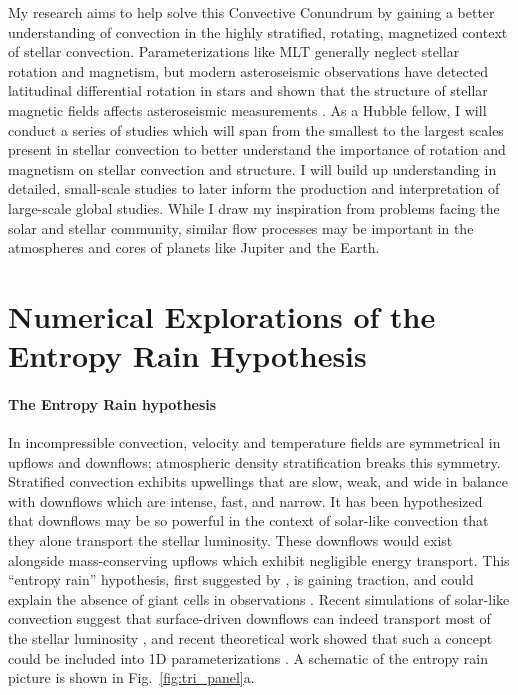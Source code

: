 \documentclass[preprint, hmargin=1in, vmargin=1in]{aastex62}
\begin{document}
My research aims to  help solve this Convective Conundrum by gaining a better understanding of convection in the highly stratified, rotating, magnetized context of stellar convection.
Parameterizations like MLT generally neglect stellar rotation and magnetism, but modern asteroseismic observations have detected latitudinal differential rotation in stars \citep{benomar&all2018} and shown that the structure of stellar magnetic fields affects asteroseismic measurements \citep{santos&all2018}.
As a Hubble fellow, I will conduct a series of studies which will span from the smallest to the largest scales present in stellar convection to better understand the importance of rotation and magnetism on stellar convection and structure.
I will build up understanding in detailed, small-scale studies to later inform the production and interpretation of large-scale global studies.
While I draw my inspiration from problems facing the solar and stellar community, similar flow processes may be important in the atmospheres and cores of planets like Jupiter and the Earth. 

\vspace{-55pt}
\section{Numerical Explorations of the Entropy Rain Hypothesis}
\paragraph{The Entropy Rain hypothesis}
In incompressible convection, velocity and temperature fields are symmetrical in upflows and downflows; atmospheric density stratification breaks this symmetry.
Stratified convection exhibits upwellings that are slow, weak, and wide in balance with downflows which are intense, fast, and narrow.
It has been hypothesized that downflows may be so powerful in the context of solar-like convection that they alone transport the stellar luminosity.
These downflows would exist alongside mass-conserving upflows which exhibit negligible energy transport.
This ``entropy rain'' hypothesis, first suggested by \citet{spruit1997}, is gaining traction, and could explain the absence of giant cells in observations \citep{hanasoge&all2015}.
Recent simulations of solar-like convection suggest that surface-driven downflows can indeed transport most of the stellar luminosity \citep{kapyla&all2017}, and recent theoretical work showed that such a concept could be included into 1D parameterizations \citep{brandenburg2016}.
A schematic of the entropy rain picture is shown in Fig.~\ref{fig:tri_panel}a.
\end{document}
